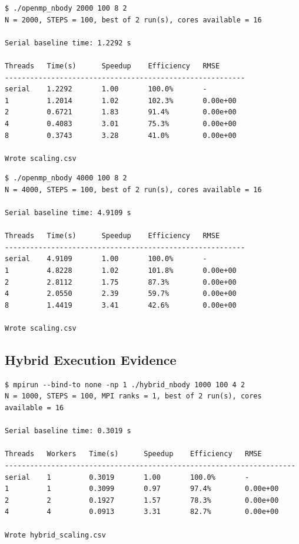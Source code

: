 \documentclass[11pt,a4paper]{article}
\begin{document}
\begin{lstlisting}[caption={OpenMP scaling sweep, $N=2000$. Best speedup 3.28$\times$ at 8 threads}]
$ ./openmp_nbody 2000 100 8 2
N = 2000, STEPS = 100, best of 2 run(s), cores available = 16

Serial baseline time: 1.2292 s

Threads   Time(s)      Speedup    Efficiency   RMSE
---------------------------------------------------------
serial    1.2292       1.00       100.0%       -
1         1.2014       1.02       102.3%       0.00e+00
2         0.6721       1.83       91.4%        0.00e+00
4         0.4083       3.01       75.3%        0.00e+00
8         0.3743       3.28       41.0%        0.00e+00

Wrote scaling.csv
\end{lstlisting}

\begin{lstlisting}[caption={OpenMP scaling sweep, $N=4000$. Best speedup 3.41$\times$ at 8 threads}]
$ ./openmp_nbody 4000 100 8 2
N = 4000, STEPS = 100, best of 2 run(s), cores available = 16

Serial baseline time: 4.9109 s

Threads   Time(s)      Speedup    Efficiency   RMSE
---------------------------------------------------------
serial    4.9109       1.00       100.0%       -
1         4.8228       1.02       101.8%       0.00e+00
2         2.8112       1.75       87.3%        0.00e+00
4         2.0550       2.39       59.7%        0.00e+00
8         1.4419       3.41       42.6%        0.00e+00

Wrote scaling.csv
\end{lstlisting}

\subsection{Hybrid Execution Evidence}

\begin{lstlisting}[caption={Hybrid MPI+OpenMP, $N=1000$, 1 MPI rank. Degenerate case: behaves like pure OpenMP}]
$ mpirun --bind-to none -np 1 ./hybrid_nbody 1000 100 4 2
N = 1000, STEPS = 100, MPI ranks = 1, best of 2 run(s), cores available = 16

Serial baseline time: 0.3019 s

Threads   Workers   Time(s)      Speedup    Efficiency   RMSE
---------------------------------------------------------------------
serial    1         0.3019       1.00       100.0%       -
1         1         0.3099       0.97       97.4%        0.00e+00
2         2         0.1927       1.57       78.3%        0.00e+00
4         4         0.0913       3.31       82.7%        0.00e+00

Wrote hybrid_scaling.csv
\end{lstlisting}
\end{document}
